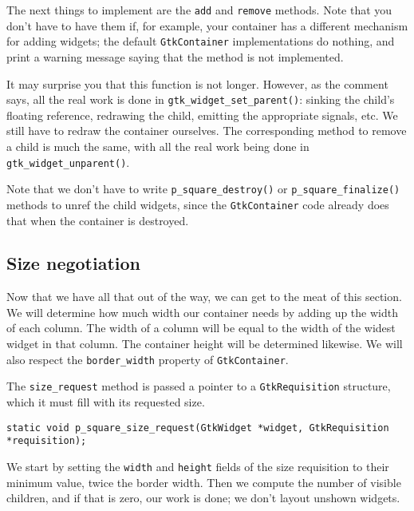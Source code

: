 \documentclass[%
			   halfparskip,smallheadings,pointlessnumbers]%
			   {scrartcl} %
\begin{document}

The next things to implement are the \lstinline$add$ and \lstinline$remove$ methods. Note that you don't have to have them if, for example, your container has a different mechanism for adding widgets; the default \lstinline$GtkContainer$ implementations do nothing, and print a warning message saying that the method is not implemented.


It may surprise you that this function is not longer. However, as the comment says, all the real work is done in \lstinline$gtk_widget_set_parent()$: sinking the child's floating reference, redrawing the child, emitting the appropriate signals, etc. We still have to redraw the container ourselves. The corresponding method to remove a child is much the same, with all the real work being done in \lstinline$gtk_widget_unparent()$.


Note that we don't have to write \lstinline$p_square_destroy()$ or \lstinline$p_square_finalize()$ methods to unref the child widgets, since the \lstinline$GtkContainer$ code already does that when the container is destroyed.

\subsection{Size negotiation}

Now that we have all that out of the way, we can get to the meat of this section. We will determine how much width our container needs by adding up the width of each column. The width of a column will be equal to the width of the widest widget in that column. The container height will be determined likewise. We will also respect the \lstinline$border_width$ property of \lstinline$GtkContainer$.

The \lstinline$size_request$ method is passed a pointer to a \lstinline$GtkRequisition$ structure, which it must fill with its requested size.

\begin{lstlisting}
static void p_square_size_request(GtkWidget *widget, GtkRequisition *requisition);
\end{lstlisting}

We start by setting the \lstinline$width$ and \lstinline$height$ fields of the size requisition to their minimum value, twice the border width. Then we compute the number of visible children, and if that is zero, our work is done; we don't layout unshown widgets.
\end{document}
